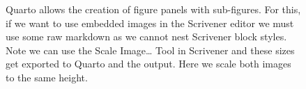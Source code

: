 \documentclass[
  12pt,
  a4paper,
  oneside,
  titlepage,
  toclink=all,
  toc=bibliography]{scrbook}
\theoremstyle{definition}
\theoremstyle{plain}
\theoremstyle{plain}
\theoremstyle{plain}
\theoremstyle{plain}
\theoremstyle{definition}
\theoremstyle{definition}
\theoremstyle{plain}
\theoremstyle{remark}
\begin{document}
\begin{figure}

\begin{minipage}[t]{0.44\linewidth}

{\centering 


}

\end{minipage}%
%
\begin{minipage}[t]{0.56\linewidth}

{\centering 


}

\end{minipage}%

\caption{\label{fig-scriv26}Quarto allows the creation of figure panels
with sub-figures. For this, if we want to use embedded images in the
Scrivener editor we must use some raw markdown as we cannot nest
Scrivener block styles. Note we can use the Scale Image\ldots{} Tool in
Scrivener and these sizes get exported to Quarto and the output. Here we
scale both images to the same height.}

\end{figure}
\end{document}
